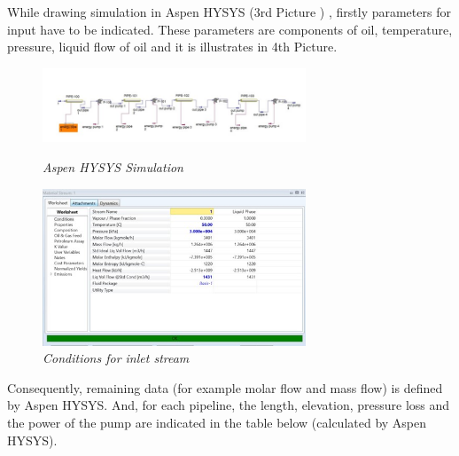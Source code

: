 \documentclass[12pt]{article}
\begin{document}
 {\fontsize{12pt}{12pt}\selectfont 
 While drawing simulation in Aspen HYSYS (3rd  Picture ) , firstly parameters for input have to be indicated. These parameters are components of oil, temperature, pressure, liquid flow of oil and it is illustrates in 4th Picture.
\\

}

\begin{figure}[H]
	\centering
	\includegraphics[width=0.7\textwidth]{assets/images/some_pipe_stuff.jpg}
	\caption{\textit{Aspen HYSYS Simulation} }

	\vspace{10mm}

	\includegraphics[width=0.7\textwidth]{assets/images/inlet.jpg}
	\caption{\textit{Conditions for inlet stream}}
	\label{fig:your_image}
 \end{figure}
 

{\fontsize{12pt}{12pt}\selectfont
Consequently, remaining data (for example molar flow and mass flow) is defined by Aspen HYSYS. And, for each pipeline, the length, elevation, pressure loss and the power of the pump are indicated in the table below (calculated by Aspen HYSYS). 
\\


}
\end{document}

